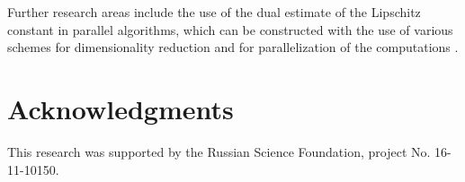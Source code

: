\documentclass[preprint]{elsarticle}
\begin{document}
	Further research areas include the use of the dual estimate of the Lipschitz constant in parallel algorithms, which can be constructed with the use of various schemes for  dimensionality reduction and  for parallelization of the computations \cite{Strongin2018}. 



\section*{Acknowledgments}
This research was supported by the Russian Science Foundation, project No. 16-11-10150.


\end{document}
